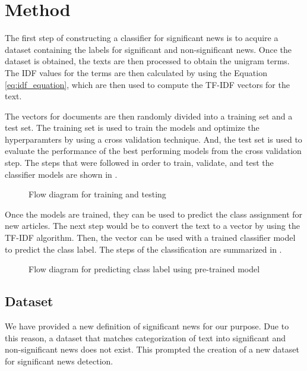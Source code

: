 \chapter{Method} \label{method}
The first step of constructing a classifier for significant news is to acquire a dataset containing the labels for significant and non-significant news. Once the dataset is obtained, the texts are then processed to obtain the unigram terms. The IDF values for the terms are then calculated by using the Equation \eqref{eq:idf_equation}, which are then used to compute the TF-IDF vectors for the text.

The vectors for documents are then randomly divided into a training set and a test set. The training set is used to train the models and optimize the hyperparamters by using a cross validation technique. And, the test set is used to evaluate the performance of the best performing models from the cross validation step. The steps that were followed in order to train, validate, and test the classifier models are shown in .

\begin{figure}[h]
    \caption{Flow diagram for training and testing}
    \label{fig:training}
\end{figure}

Once the models are trained, they can be used to predict the class assignment for new articles. The next step would be to convert the text to a vector by using the TF-IDF algorithm. Then, the vector can be used with a trained classifier model to predict the class label. The steps of the classification are summarized in .

\begin{figure}[h]
    \caption{Flow diagram for predicting class label using pre-trained model}
    \label{fig:prediction}
\end{figure}

\section{Dataset}
We have provided a new definition of significant news for our purpose. Due to this reason, a dataset that matches categorization of text into significant and non-significant news does not exist. This prompted the creation of a new dataset for significant news detection. 

